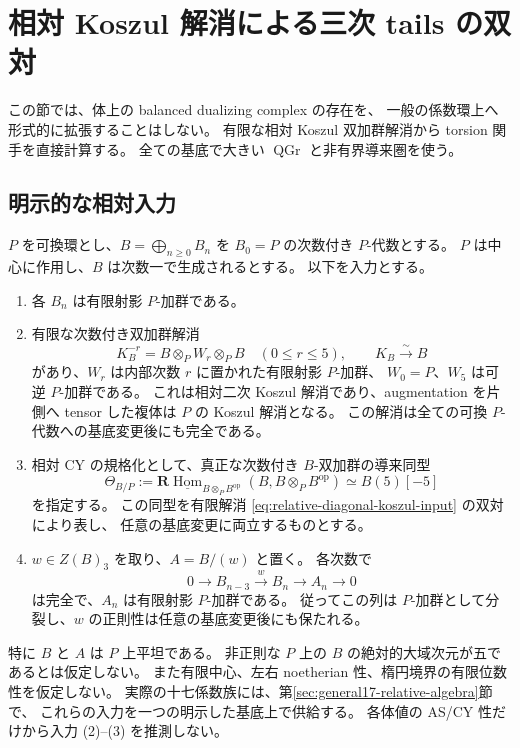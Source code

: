 \section{相対 Koszul 解消による三次 tails の双対}
\label{sec:relative-koszul-line-cohomology}

この節では、体上の balanced dualizing complex の存在を、
一般の係数環上へ形式的に拡張することはしない。
有限な相対 Koszul 双加群解消から torsion 関手を直接計算する。
全ての基底で大きい $\operatorname{QGr}$ と非有界導来圏を使う。

\subsection{明示的な相対入力}

$P$ を可換環とし、$B=\bigoplus_{n\geq0}B_n$ を $B_0=P$ の次数付き $P$-代数とする。
$P$ は中心に作用し、$B$ は次数一で生成されるとする。
以下を入力とする。
\begin{enumerate}
\item 各 $B_n$ は有限射影 $P$-加群である。
\item 有限な次数付き双加群解消
\begin{equation}\label{eq:relative-diagonal-koszul-input}
 K_B^{-r}=B\otimes_P W_r\otimes_P B\quad(0\leq r\leq5),
 \qquad K_B\xrightarrow{\sim}B
\end{equation}
があり、$W_r$ は内部次数 $r$ に置かれた有限射影 $P$-加群、
$W_0=P$、$W_5$ は可逆 $P$-加群である。
これは相対二次 Koszul 解消であり、augmentation を片側へ tensor した複体は
$P$ の Koszul 解消となる。
この解消は全ての可換 $P$-代数への基底変更後にも完全である。
\item 相対 CY の規格化として、真正な次数付き $B$-双加群の導来同型
\begin{equation}\label{eq:relative-cy-five-orientation}
 \Theta_{B/P}:=
 \mathbf R\underline{\operatorname{Hom}}_{B\otimes_PB^{\mathrm{op}}}
      (B,B\otimes_PB^{\mathrm{op}})
 \simeq B(5)[-5]
\end{equation}
を指定する。
この同型を有限解消 \eqref{eq:relative-diagonal-koszul-input} の双対により表し、
任意の基底変更に両立するものとする。
\item $w\in Z(B)_3$ を取り、$A=B/(w)$ と置く。
各次数で
\begin{equation}\label{eq:relative-cubic-split-sequence}
 0\longrightarrow B_{n-3}\xrightarrow{\,w\,}B_n
 \longrightarrow A_n\longrightarrow0
\end{equation}
は完全で、$A_n$ は有限射影 $P$-加群である。
従ってこの列は $P$-加群として分裂し、$w$ の正則性は任意の基底変更後にも保たれる。
\end{enumerate}
特に $B$ と $A$ は $P$ 上平坦である。
非正則な $P$ 上の $B$ の絶対的大域次元が五であるとは仮定しない。
また有限中心、左右 noetherian 性、楕円境界の有限位数性を仮定しない。
実際の十七係数族には、第\ref{sec:general17-relative-algebra}節で、
これらの入力を一つの明示した基底上で供給する。
各体値の AS/CY 性だけから入力 (2)--(3) を推測しない。

